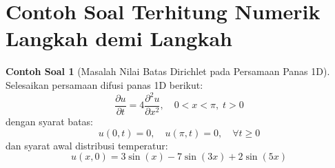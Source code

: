 \documentclass[11pt,a4paper]{article}
\theoremstyle{definition}
\newtheorem{example}{Contoh Soal}[section]
\begin{document}
\section{Contoh Soal Terhitung Numerik Langkah demi Langkah}

\begin{example}[Masalah Nilai Batas Dirichlet pada Persamaan Panas 1D]
Selesaikan persamaan difusi panas 1D berikut:
\begin{equation*}
    \frac{\partial u}{\partial t} = 4 \frac{\partial^2 u}{\partial x^2}, \quad 0 < x < \pi, \; t > 0
\end{equation*}
dengan syarat batas:
\begin{equation*}
    u(0, t) = 0, \quad u(\pi, t) = 0, \quad \forall t \ge 0
\end{equation*}
dan syarat awal distribusi temperatur:
\begin{equation*}
    u(x, 0) = 3 \sin(x) - 7 \sin(3x) + 2 \sin(5x)
\end{equation*}
\end{example}
\end{document}
